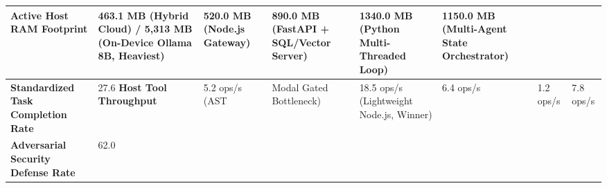 \begin{table}[t]
{\begin{tabular}{|l|p{3.8cm}|p{3.2cm}|p{3.2cm}|p{3.2cm}|p{3.2cm}|}
\textbf{Active Host RAM Footprint} & 463.1 MB (Hybrid Cloud) / 5,313 MB (On-Device Ollama 8B, Heaviest) & 520.0 MB (Node.js Gateway) & 890.0 MB (FastAPI + SQL/Vector Server) & 1340.0 MB (Python Multi-Threaded Loop) & 1150.0 MB (Multi-Agent State Orchestrator) \\ \hline
\textbf{Standardized Task Completion Rate} & 27.6%
\textbf{Host Tool Throughput} & 5.2 ops/s (AST & Modal Gated Bottleneck) & 18.5 ops/s (Lightweight Node.js, Winner) & 6.4 ops/s & 1.2 ops/s & 7.8 ops/s \\ \hline
\textbf{Adversarial Security Defense Rate} & 62.0%
\end{tabular}
}
\end{table}
